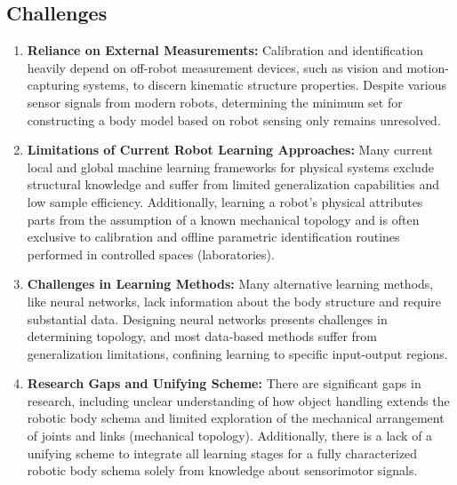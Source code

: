 \documentclass[12pt, a4paper]{article}
\begin{document}
\subsection*{Challenges}
\begin{enumerate}
	\item \textbf{Reliance on External Measurements:} Calibration and identification heavily depend on off-robot measurement devices, such as vision and motion-capturing systems, to discern kinematic structure properties. Despite various sensor signals from modern robots, determining the minimum set for constructing a body model based on robot sensing only remains unresolved.

    \item \textbf{Limitations of Current Robot Learning Approaches:} Many current local and global machine learning frameworks for physical systems exclude structural knowledge and suffer from limited generalization capabilities and low sample efficiency. Additionally, learning a robot's physical attributes parts from the assumption of a known mechanical topology and is often exclusive to calibration and offline parametric identification routines performed in controlled spaces (laboratories).

	\item \textbf{Challenges in Learning Methods:} Many alternative learning methods, like neural networks, lack information about the body structure and require substantial data. Designing neural networks presents challenges in determining topology, and most data-based methods suffer from generalization limitations, confining learning to specific input-output regions.

	\item \textbf{Research Gaps and Unifying Scheme:} There are significant gaps in research, including unclear understanding of how object handling extends the robotic body schema and limited exploration of the mechanical arrangement of joints and links (mechanical topology). Additionally, there is a lack of a unifying scheme to integrate all learning stages for a fully characterized robotic body schema solely from knowledge about sensorimotor signals. 
\end{enumerate}
\end{document}
